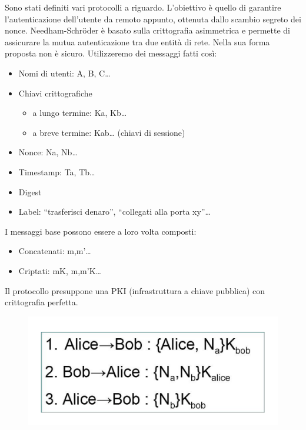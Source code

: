 Sono stati definiti vari protocolli a riguardo. L’obiettivo è quello di 
garantire l’autenticazione
dell’utente da remoto appunto, ottenuta dallo scambio segreto dei nonce.
Needham-Schröder è basato sulla crittografia asimmetrica e permette 
di assicurare la mutua
autenticazione tra due entità di rete. Nella sua forma proposta 
non è sicuro.
Utilizzeremo dei messaggi fatti così:

\begin{itemize}
    \item Nomi di utenti: A, B, C…
    \item Chiavi crittografiche
          \begin{itemize}
              \item a lungo termine: Ka, Kb…
              \item a breve termine: Kab… (chiavi di sessione)
          \end{itemize}
    \item Nonce: Na, Nb…
    \item Timestamp: Ta, Tb…
    \item Digest
    \item Label: “trasferisci denaro”, “collegati alla porta xy”…
\end{itemize}

I messaggi base possono essere a loro volta composti:
\begin{itemize}
    \item Concatenati: m,m’…
    \item Criptati: mK, {m,m’}K…
\end{itemize}

Il protocollo presuppone una PKI (infrastruttura a chiave pubblica) 
con crittografia perfetta.

\begin{figure}[H]
    \centering
    \includegraphics[width=\textwidth, keepaspectratio]{capitoli/crittografia/imgs/alieno.png}
\end{figure}

